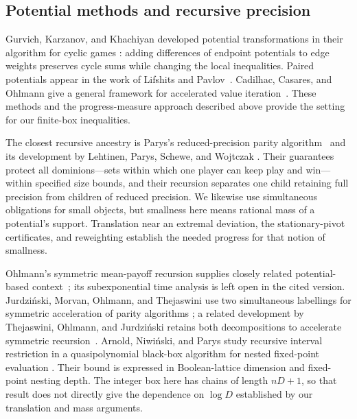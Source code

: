 \subsection{Potential methods and recursive precision}

Gurvich, Karzanov, and Khachiyan developed potential transformations
in their algorithm for cyclic games
\cite{GurvichKarzanovKhachiyan1988,KarzanovLebedev1993}: adding
differences of endpoint potentials to edge weights preserves cycle
sums while changing the local inequalities. Paired potentials appear
in the work of Lifshits and Pavlov~\cite{LifshitsPavlov2007}.
Cadilhac, Casares, and Ohlmann give a general framework for accelerated
value iteration~\cite{CadilhacCasaresOhlmann2025}. These methods and
the progress-measure approach described above provide the setting
for our finite-box inequalities.

The closest recursive ancestry is Parys's reduced-precision parity
algorithm~\cite[Algorithm~2, Section~5, and Lemma~6.1]{Parys2019}
and its development by Lehtinen, Parys, Schewe, and Wojtczak
\cite{LehtinenParysScheweWojtczak2022}. Their guarantees protect
all dominions---sets within which one player can keep play and win---
within specified size bounds, and their recursion
separates one child retaining full precision from children of reduced
precision. We likewise use simultaneous obligations for small objects,
but smallness here means rational mass of a potential's support.
Translation near an extremal deviation, the stationary-pivot
certificates, and reweighting establish the needed progress for that
notion of smallness.

Ohlmann's symmetric mean-payoff recursion supplies closely related
potential-based context~\cite{Ohlmann2026}; its subexponential time
analysis is left open in the cited version. Jurdzi\'nski, Morvan,
Ohlmann, and Thejaswini use two simultaneous labellings for symmetric
acceleration of parity algorithms
\cite{JurdzinskiMorvanOhlmannThejaswini2020}; a related development
by Thejaswini, Ohlmann, and Jurdzi\'nski retains both decompositions
to accelerate symmetric recursion~\cite{ThejaswiniOhlmannJurdzinski2022}.
Arnold, Niwi\'nski, and Parys study recursive interval restriction in a
quasipolynomial black-box algorithm for nested fixed-point evaluation
\cite{ArnoldNiwinskiParys2021}. Their bound is expressed in
Boolean-lattice dimension and fixed-point nesting depth. The integer
box here has chains of length $nD+1$, so that result does not directly
give the dependence on $\log D$ established by our translation and
mass arguments.

